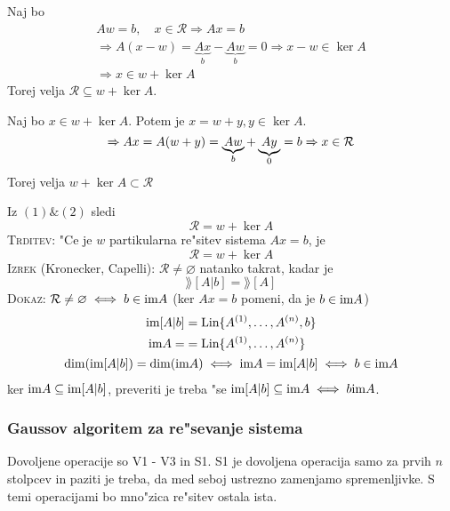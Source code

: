Naj bo 
\begin{gather*}
A w = b, \quad x \in \mathcal{R} \Rightarrow Ax = b \\
\Rightarrow A(x - w) = \underbrace{Ax}_{b} - \underbrace{Aw}_{b} = 0 \Rightarrow x - w \in \ker A \\
\Rightarrow x \in w + \ker A
\end{gather*}
Torej velja $\mathcal{R} \subseteq w + \ker A$.

Naj bo $x \in w + \ker A$. Potem je $x = w + y, y \in \ker A$.
\begin{equation*}
\Rightarrow Ax = A(w + y) = \underbrace{Aw}_{b} + \underbrace{Ay}_{0} = b \\
\Rightarrow x \in \mathcal{R}
\end{equation*}
Torej velja $w + \ker A \subset \mathcal{R}$

Iz $(1) \& (2)$ sledi
\begin{equation*}
\mathcal{R} = w + \ker A
\end{equation*}
\textsc{Trditev:} "Ce je $w$ partikularna re"sitev sistema $Ax = b$, je 
\begin{equation*}
\mathcal{R} = w + \ker A
\end{equation*}
\textsc{Izrek} (Kronecker, Capelli): $\mathcal{R} \neq \varnothing$ natanko takrat, kadar je
\begin{equation*}
\rang [A | b] = \rang[A]
\end{equation*}
\textsc{Dokaz:} $\mathcal{R} \neq \varnothing \iff b \in \text{im} A$ (ker $Ax = b$ pomeni, da je $b \in \text{im} A$)
\begin{gather*}
\begin{aligned}
\text{im} [A | b] &= \text{Lin} \{A^{(1)}, \ldots, A^{(n)}, b\} \\
\text{im} A = &= \text{Lin} \{A^{(1)}, \ldots, A^{(n)}\}
\end{aligned}\\
\dim (\text{im} [A | b]) = \dim (\text{im} A) \iff \text{im} A = \text{im} [A | b] \iff b \in \text{im} A
\end{gather*}
ker $\text{im} A \subseteq \text{im} [A | b]$, preveriti je treba "se $\text{im} [A | b] \subseteq \text{im} A \iff b \text{im} A$.
%
\subsubsection{Gaussov algoritem za re"sevanje sistema}
Dovoljene operacije so V1 - V3 in S1. S1 je dovoljena operacija samo za prvih $n$ stolpcev in paziti je treba, da med seboj ustrezno zamenjamo spremenljivke. S temi operacijami bo mno"zica re"sitev ostala ista.


